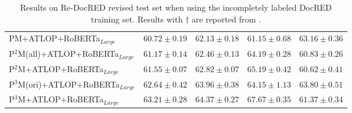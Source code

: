 \documentclass[11pt]{article}
\begin{document}
\begin{table}
\begin{tabular}{lcccc}
PM+ATLOP+RoBERTa$_{Large}$ & $60.72 \pm 0.19$ & $62.13 \pm 0.18$ & $61.15 \pm 0.68$ & $63.16 \pm 0.36$ \\
P$^{2}$M(all)+ATLOP+RoBERTa$_{Large}$ & $61.17 \pm 0.14$ & $62.46 \pm 0.13$ & $64.19 \pm 0.28$ & $60.83 \pm 0.26$ \\
P$^{2}$M+ATLOP+RoBERTa$_{Large}$ & $61.55 \pm 0.07$ & $62.82 \pm 0.07$ & $65.19 \pm 0.42$ & $60.62 \pm 0.41$ \\
P$^{3}$M(ori)+ATLOP+RoBERTa$_{Large}$ & $62.64 \pm 0.42$ & $63.96 \pm 0.38$ & $64.15 \pm 1.13$ & $\mathbf{63.80} \pm \mathbf{0.51}$ \\
P$^{3}$M+ATLOP+RoBERTa$_{Large}$ & $\mathbf{63.21} \pm \mathbf{0.28}$ & $\mathbf{64.37} \pm \mathbf{0.27}$ & $67.67 \pm 0.35$ & $61.37 \pm 0.34$ \\
\bottomrule
\end{tabular}
\caption{\label{tab6}
Results on Re-DocRED revised test set when using the incompletely labeled DocRED training set. Results with $\dagger$ are reported from \citep{wang2022unified}.
}
\end{table}
\end{document}
